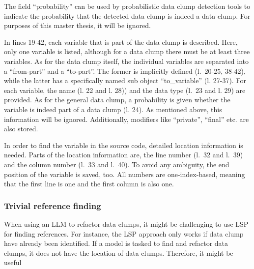 The field \enquote{probability} can be used by probabilistic data clump detection tools to indicate the probability that the detected data clump is indeed a data clump. For purposes of this master thesis, it will be ignored. 

In lines 19-42, each variable that is part of the data clump is described. Here, only one variable is listed, although for a data clump there must be at least three variables. As for the data clump itself, the individual variables are separated into a \enquote{from-part} and a \enquote{to-part}. The former is implicitly defined (l.~20-25, 38-42), while the latter has a specifically named sub object \enquote{to\_variable} (l. 27-37). For each variable, the name (l. 22 and l. 28)) and the data type (l.~23 and l. 29) are provided. As for the general data clump, a probability is given whether the variable is indeed part of a data clump (l. 24). As mentioned above, this information will be ignored.  Additionally, modifiers like \enquote{private}, \enquote{final} etc. are also stored. 

In order to find the variable in the source code, detailed location information is needed. Parts of the location information are, the line number (l.~32 and l.~39) and the column number (l.~33 and l.~40). To avoid any ambiguity, the end position of the variable is saved, too. All numbers are one-index-based, meaning that the first line is one and the first column is also one. 

\subsubsection{Trivial reference finding}
When using  an \ac{LLM} to refactor data clumps, it might be challenging to use \ac{LSP} for finding references. For instance, the \ac{LSP} approach only works if data clump have already been identified. If a model is tasked to find and refactor data clumps, it does not have the location of data clumps. Therefore, it might be useful